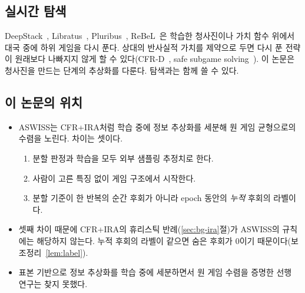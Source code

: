 \subsection{실시간 탐색}
DeepStack~\citep{moravcik2017deepstack}, Libratus~\citep{brown2018superhuman}, Pluribus~\citep{brown2019superhuman}, ReBeL~\citep{brown2020combining}은 학습한 청사진이나 가치 함수 위에서 대국 중에 하위 게임을 다시 푼다.
상대의 반사실적 가치를 제약으로 두면 다시 푼 전략이 원래보다 나빠지지 않게 할 수 있다(CFR-D~\citep{burch2014solving}, safe subgame solving~\citep{brown2017safe}).
이 논문은 청사진을 만드는 단계의 추상화를 다룬다. 탐색과는 함께 쓸 수 있다.

\subsection{이 논문의 위치}
\begin{itemize}
  \item ASWISS는 CFR+IRA처럼 학습 중에 정보 추상화를 세분해 원 게임 균형으로의 수렴을 노린다. 차이는 셋이다.
    \begin{enumerate}
      \item 분할 판정과 학습을 모두 외부 샘플링 추정치로 한다.
      \item 사람이 고른 특징 없이 게임 구조에서 시작한다.
      \item 분할 기준이 한 반복의 순간 후회가 아니라 epoch 동안의 \emph{누적} 후회의 라벨이다.
    \end{enumerate}
  \item 셋째 차이 때문에 CFR+IRA의 휴리스틱 반례(\ref{sec:bg-ira}절)가 ASWISS의 규칙에는 해당하지 않는다. 누적 후회의 라벨이 같으면 숨은 후회가 0이기 때문이다(보조정리~\ref{lem:label}).
  \item 표본 기반으로 정보 추상화를 학습 중에 세분하면서 원 게임 수렴을 증명한 선행 연구는 찾지 못했다. 
\end{itemize}
